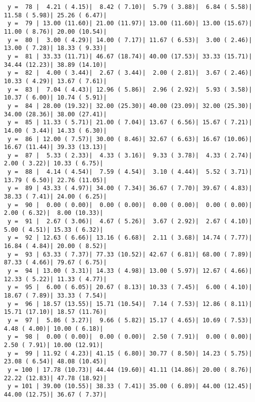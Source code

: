 \documentclass[10pt]{article}
\begin{document}
\begin{Verbatim}
 y =  78 |  4.21 ( 4.15)|  8.42 ( 7.10)|  5.79 ( 3.88)|  6.84 ( 5.58)| 11.58 ( 5.98)| 25.26 ( 6.47)|
 y =  79 | 13.00 (11.60)| 21.00 (11.97)| 13.00 (11.60)| 13.00 (15.67)| 11.00 ( 8.76)| 20.00 (10.54)|
 y =  80 |  3.00 ( 4.29)| 14.00 ( 7.17)| 11.67 ( 6.53)|  3.00 ( 2.46)| 13.00 ( 7.28)| 18.33 ( 9.33)|
 y =  81 | 33.33 (11.71)| 46.67 (18.74)| 40.00 (17.53)| 33.33 (15.71)| 34.44 (12.23)| 38.89 (14.10)|
 y =  82 |  4.00 ( 3.44)|  2.67 ( 3.44)|  2.00 ( 2.81)|  3.67 ( 2.46)| 10.33 ( 4.29)| 13.67 ( 7.61)|
 y =  83 |  7.04 ( 4.43)| 12.96 ( 5.86)|  2.96 ( 2.92)|  5.93 ( 3.58)| 10.37 ( 6.00)| 10.74 ( 5.91)|
 y =  84 | 28.00 (19.32)| 32.00 (25.30)| 40.00 (23.09)| 32.00 (25.30)| 34.00 (28.36)| 38.00 (27.41)|
 y =  85 | 11.33 ( 5.71)| 21.00 ( 7.04)| 13.67 ( 6.56)| 15.67 ( 7.21)| 14.00 ( 3.44)| 14.33 ( 6.30)|
 y =  86 | 12.00 ( 7.57)| 30.00 ( 8.46)| 32.67 ( 6.63)| 16.67 (10.06)| 16.67 (11.44)| 39.33 (13.13)|
 y =  87 |  5.33 ( 2.33)|  4.33 ( 3.16)|  9.33 ( 3.78)|  4.33 ( 2.74)|  2.00 ( 3.22)| 10.33 ( 6.75)|
 y =  88 |  4.14 ( 4.54)|  7.59 ( 4.54)|  3.10 ( 4.44)|  5.52 ( 3.71)| 13.79 ( 6.50)| 22.76 (11.05)|
 y =  89 | 43.33 ( 4.97)| 34.00 ( 7.34)| 36.67 ( 7.70)| 39.67 ( 4.83)| 38.33 ( 7.41)| 24.00 ( 6.25)|
 y =  90 |  0.00 ( 0.00)|  0.00 ( 0.00)|  0.00 ( 0.00)|  0.00 ( 0.00)|  2.00 ( 6.32)|  8.00 (10.33)|
 y =  91 |  2.67 ( 3.06)|  4.67 ( 5.26)|  3.67 ( 2.92)|  2.67 ( 4.10)|  5.00 ( 4.51)| 15.33 ( 6.32)|
 y =  92 | 12.63 ( 6.66)| 13.16 ( 6.68)|  2.11 ( 3.68)| 14.74 ( 7.77)| 16.84 ( 4.84)| 20.00 ( 8.52)|
 y =  93 | 63.33 ( 7.37)| 77.33 (10.52)| 42.67 ( 6.81)| 68.00 ( 7.89)| 87.33 ( 4.66)| 79.67 ( 6.75)|
 y =  94 | 13.00 ( 3.31)| 14.33 ( 4.98)| 13.00 ( 5.97)| 12.67 ( 4.66)| 12.33 ( 5.22)| 11.33 ( 4.77)|
 y =  95 |  6.00 ( 6.05)| 20.67 ( 8.13)| 10.33 ( 7.45)|  6.00 ( 4.10)| 18.67 ( 7.89)| 33.33 ( 7.54)|
 y =  96 | 18.57 (13.55)| 15.71 (10.54)|  7.14 ( 7.53)| 12.86 ( 8.11)| 15.71 (17.10)| 18.57 (11.76)|
 y =  97 |  5.86 ( 3.27)|  9.66 ( 5.82)| 15.17 ( 4.65)| 10.69 ( 7.53)|  4.48 ( 4.00)| 10.00 ( 6.18)|
 y =  98 |  0.00 ( 0.00)|  0.00 ( 0.00)|  2.50 ( 7.91)|  0.00 ( 0.00)|  2.50 ( 7.91)| 10.00 (12.91)|
 y =  99 | 11.92 ( 4.23)| 41.15 ( 6.80)| 30.77 ( 8.50)| 14.23 ( 5.75)| 23.08 ( 6.54)| 48.08 (10.45)|
 y = 100 | 17.78 (10.73)| 44.44 (19.60)| 41.11 (14.86)| 20.00 ( 8.76)| 22.22 (12.83)| 47.78 (18.92)|
 y = 101 | 39.00 (10.55)| 38.33 ( 7.41)| 35.00 ( 6.89)| 44.00 (12.45)| 44.00 (12.75)| 36.67 ( 7.37)|
\end{Verbatim}
\end{document}
